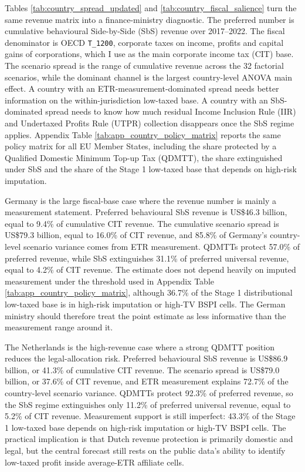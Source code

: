 \documentclass[11pt,a4paper]{article}
\newcommand{\code}[1]{\texttt{#1}}
\begin{document}




Tables \ref{tab:country_spread_updated} and \ref{tab:country_fiscal_salience} turn the same revenue matrix into a finance-ministry diagnostic. The preferred number is cumulative behavioural Side-by-Side (SbS) revenue over 2017--2022. The fiscal denominator is OECD \code{T\_1200}, corporate taxes on income, profits and capital gains of corporations, which I use as the main corporate income tax (CIT) base. The scenario spread is the range of cumulative revenue across the 32 factorial scenarios, while the dominant channel is the largest country-level ANOVA main effect. A country with an ETR-measurement-dominated spread needs better information on the within-jurisdiction low-taxed base. A country with an SbS-dominated spread needs to know how much residual Income Inclusion Rule (IIR) and Undertaxed Profits Rule (UTPR) collection disappears once the SbS regime applies. Appendix Table \ref{tab:app_country_policy_matrix} reports the same policy matrix for all EU Member States, including the share protected by a Qualified Domestic Minimum Top-up Tax (QDMTT), the share extinguished under SbS and the share of the Stage 1 low-taxed base that depends on high-risk imputation.

Germany is the large fiscal-base case where the revenue number is mainly a measurement statement. Preferred behavioural SbS revenue is US\$46.3 billion, equal to 9.4\% of cumulative CIT revenue. The cumulative scenario spread is US\$79.3 billion, equal to 16.0\% of CIT revenue, and 85.8\% of Germany's country-level scenario variance comes from ETR measurement. QDMTTs protect 57.0\% of preferred revenue, while SbS extinguishes 31.1\% of preferred universal revenue, equal to 4.2\% of CIT revenue. The estimate does not depend heavily on imputed measurement under the threshold used in Appendix Table \ref{tab:app_country_policy_matrix}, although 36.7\% of the Stage 1 distributional low-taxed base is in high-risk imputation or high-TV BSPI cells. The German ministry should therefore treat the point estimate as less informative than the measurement range around it.

The Netherlands is the high-revenue case where a strong QDMTT position reduces the legal-allocation risk. Preferred behavioural SbS revenue is US\$86.9 billion, or 41.3\% of cumulative CIT revenue. The scenario spread is US\$79.0 billion, or 37.6\% of CIT revenue, and ETR measurement explains 72.7\% of the country-level scenario variance. QDMTTs protect 92.3\% of preferred revenue, so the SbS regime extinguishes only 11.2\% of preferred universal revenue, equal to 5.2\% of CIT revenue. Measurement support is still imperfect: 43.3\% of the Stage 1 low-taxed base depends on high-risk imputation or high-TV BSPI cells. The practical implication is that Dutch revenue protection is primarily domestic and legal, but the central forecast still rests on the public data's ability to identify low-taxed profit inside average-ETR affiliate cells.
\end{document}
